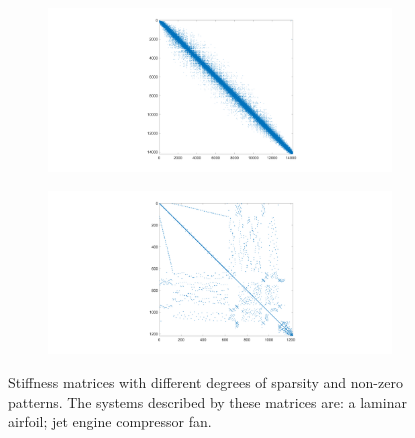 \documentclass[twoside]{article}
\begin{document}
		\begin{figure}[h!]
			\centering
			\begin{subfigure}{0.28\textwidth}
				\includegraphics[width=\textwidth,trim={390 40 400 40},clip]{2d_airfoil}
				\caption{}
				\label{fig:mat_foil}
			\end{subfigure}
			\enskip
			\hspace{1cm}
			\begin{subfigure}{0.28\textwidth}
				\includegraphics[width=\textwidth,trim={390 40 400 40},clip]{2d_fan}
				\caption{}
				\label{fig:mat_fan}
			\end{subfigure}
			\caption{Stiffness matrices with different degrees of sparsity and non-zero patterns. The systems described by these matrices are: 
			 a laminar airfoil;  jet engine compressor fan.}
			\label{fig:matrices}
		\end{figure}

\end{document}
